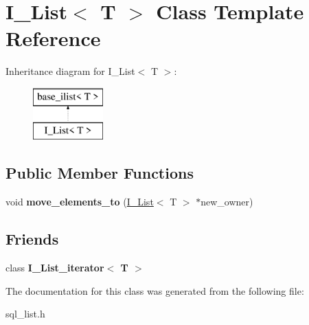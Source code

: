 \hypertarget{classI__List}{}\section{I\+\_\+\+List$<$ T $>$ Class Template Reference}
\label{classI__List}
Inheritance diagram for I\+\_\+\+List$<$ T $>$\+:\begin{figure}[H]
\begin{center}
\leavevmode
\includegraphics[height=2.000000cm]{classI__List}
\end{center}
\end{figure}
\subsection*{Public Member Functions}
\begin{DoxyCompactItemize}
\item 
\mbox{\label{classI__List_a2b262d9f11787c4339d32b0fab2c41dd}} 
void {\bfseries move\+\_\+elements\+\_\+to} (\mbox{\hyperlink{classI__List}{I\+\_\+\+List}}$<$ T $>$ $\ast$new\+\_\+owner)
\end{DoxyCompactItemize}
\subsection*{Friends}
\begin{DoxyCompactItemize}
\item 
\mbox{\label{classI__List_abf119f2613edcd92756c5c0c4c6e2b18}} 
class {\bfseries I\+\_\+\+List\+\_\+iterator$<$ T $>$}
\end{DoxyCompactItemize}


The documentation for this class was generated from the following file\+:\begin{DoxyCompactItemize}
\item 
sql\+\_\+list.\+h\end{DoxyCompactItemize}
